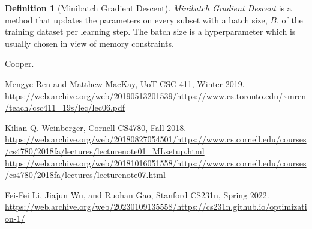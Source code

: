 \documentclass[11pt]{article}
\numberwithin{equation}{section}
\theoremstyle{definition}%
\newtheorem{definition}{Definition}[section]%
\begin{document}
\begin{definition}[Minibatch Gradient Descent]
    \emph{Minibatch Gradient Descent} is a method that updates the parameters on every subset with a batch size, $B$, of the training dataset per learning step. The batch size is a hyperparameter which is usually chosen in view of memory constraints. %
\end{definition}

\begin{thebibliography}{2}
     Cooper.

     Mengye Ren and Matthew MacKay, UoT CSC 411, Winter 2019. \url{https://web.archive.org/web/20190513201539/https://www.cs.toronto.edu/~mren/teach/csc411_19s/lec/lec06.pdf}

     Kilian Q. Weinberger, Cornell CS4780, Fall 2018.
    \url{https://web.archive.org/web/20180827054501/https://www.cs.cornell.edu/courses/cs4780/2018fa/lectures/lecturenote01_MLsetup.html}
     \url{https://web.archive.org/web/20181016051558/https://www.cs.cornell.edu/courses/cs4780/2018fa/lectures/lecturenote07.html}

     Fei-Fei Li, Jiajun Wu, and Ruohan Gao, Stanford CS231n, Spring 2022. \url{https://web.archive.org/web/20230109135558/https://cs231n.github.io/optimization-1/}

\end{thebibliography}
\end{document}
